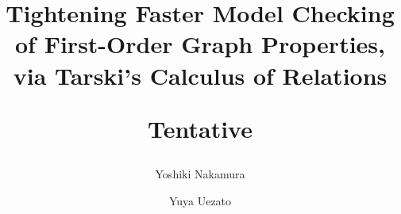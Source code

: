 \documentclass[a4paper,UKenglish,cleveref, autoref, thm-restate]{lipics-v2021}
\title{Tightening Faster Model Checking of First-Order Graph Properties, via Tarski's Calculus of Relations \begin{sideyoshiki}Tentative\end{sideyoshiki}} %
\author{Yoshiki Nakamura}{Science Tokyo, Japan}{mail}{https://orcid.org/0000-0003-4106-0408}{}
\author{Yuya Uezato}{CyberAgent, Inc., Japan}{mail}{https://orcid.org/0009-0005-8834-010X}{}
\begin{document}
\maketitle

\begin{abstract}

\end{abstract}






% 






\clearpage
\appendix


\clearpage

\end{document}
